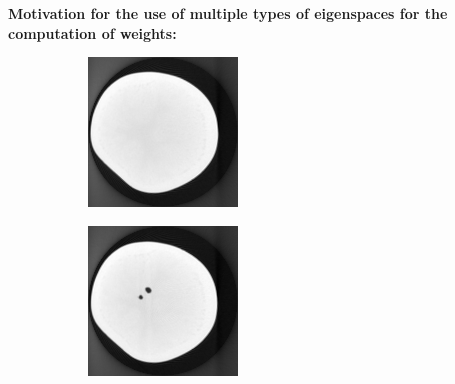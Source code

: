 \documentclass[journal]{IEEEtran}
\begin{document}
\textbf{Motivation for the use of multiple types of eigenspaces for the computation of weights:}

\begin{figure}[!h]
    \begin{subfigure}[b]{0.24\linewidth}
        \includegraphics[width=\textwidth]{../images/potato/template_1.png}
\captionsetup{labelformat=empty}       
 \caption{}
    \end{subfigure}
    \begin{subfigure}[b]{0.24\linewidth}
        \includegraphics[width=\textwidth]{../images/potato/template_2.png}

\end{subfigure}
\end{figure}
\end{document}
